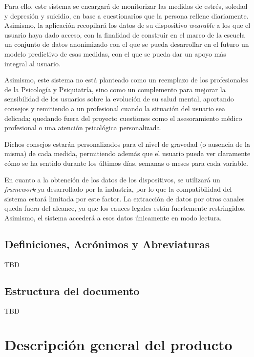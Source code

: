         Para ello, este sistema se encargará de monitorizar las medidas de estrés, soledad y depresión y suicidio, en base a cuestionarios que la persona rellene diariamente. Asimismo, la aplicación recopilará los datos de su dispositivo \textit{wearable} a los que el usuario haya dado acceso, con la finalidad de construir en el marco de la escuela un conjunto de datos anonimizado con el que se pueda desarrollar en el futuro un modelo predictivo de esas medidas, con el que se pueda dar un apoyo más integral al usuario.

        Asimismo, este sistema no está planteado como un reemplazo de los profesionales de la Psicología y Psiquiatría, sino como un complemento para mejorar la sensibilidad de los usuarios sobre la evolución de su salud mental, aportando consejos y remitiendo a un profesional cuando la situación del usuario sea delicada; quedando fuera del proyecto cuestiones como el asesoramiento médico profesional o una atención psicológica personalizada.


        Dichos consejos estarán personalizados para el nivel de gravedad (o ausencia de la misma) de cada medida, permitiendo además que el usuario pueda ver claramente cómo se ha sentido durante los últimos días, semanas o meses para cada variable.

        En cuanto a la obtención de los datos de los dispositivos, se utilizará un \textit{framework} ya desarrollado por la industria, por lo que la compatibilidad del sistema estará limitada por este factor. La extracción de datos por otros canales queda fuera del alcance, ya que los cauces legales están fuertemente restringidos. Asimismo, el sistema accederá a esos datos únicamente en modo lectura.

        
    \subsection{Definiciones, Acrónimos y Abreviaturas}
        TBD
        
    \subsection{Estructura del documento}
        TBD
        
\section{Descripción general del producto}

